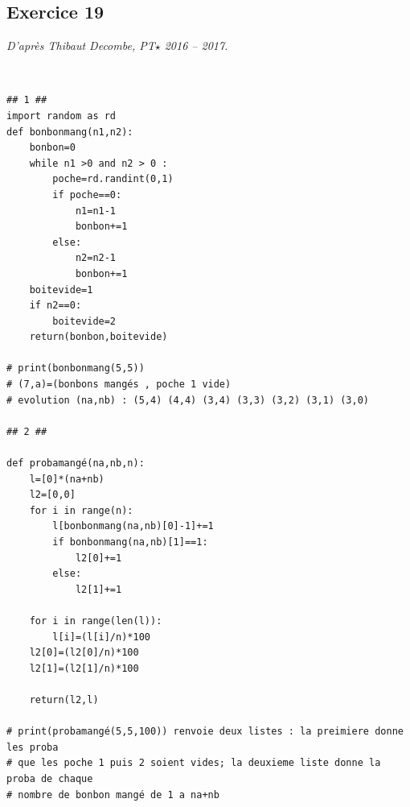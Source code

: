 \documentclass[10pt,fleqn]{article} %
\begin{document}
\subsection*{Exercice 19}
\textit{D'après Thibaut Decombe, PT$\star$ 2016 -- 2017.}
\begin{corrige}
$\quad$
\begin{lstlisting}
## 1 ##
import random as rd
def bonbonmang(n1,n2):
    bonbon=0
    while n1 >0 and n2 > 0 :
        poche=rd.randint(0,1)
        if poche==0:
            n1=n1-1
            bonbon+=1
        else:
            n2=n2-1
            bonbon+=1
    boitevide=1
    if n2==0:
        boitevide=2
    return(bonbon,boitevide)

# print(bonbonmang(5,5))
# (7,a)=(bonbons mangés , poche 1 vide)
# evolution (na,nb) : (5,4) (4,4) (3,4) (3,3) (3,2) (3,1) (3,0)

## 2 ##

def probamangé(na,nb,n):
    l=[0]*(na+nb)
    l2=[0,0]
    for i in range(n):
        l[bonbonmang(na,nb)[0]-1]+=1
        if bonbonmang(na,nb)[1]==1:
            l2[0]+=1
        else:
            l2[1]+=1
            
    for i in range(len(l)):
        l[i]=(l[i]/n)*100
    l2[0]=(l2[0]/n)*100
    l2[1]=(l2[1]/n)*100
    
    return(l2,l)

# print(probamangé(5,5,100)) renvoie deux listes : la preimiere donne les proba
# que les poche 1 puis 2 soient vides; la deuxieme liste donne la proba de chaque
# nombre de bonbon mangé de 1 a na+nb 
    
\end{lstlisting}
\end{corrige}
\end{document}
